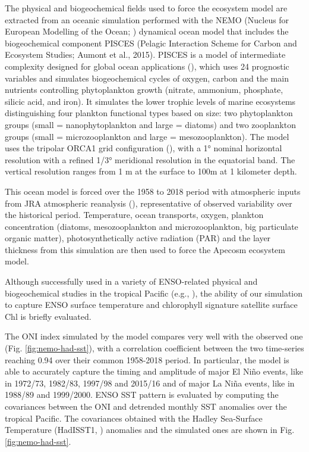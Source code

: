 The physical and biogeochemical fields used to force the ecosystem model are extracted from an oceanic simulation performed with the NEMO (Nucleus for European Modelling of the Ocean; \cite{madecNEMOOceanEngine2019}) dynamical ocean model that includes the biogeochemical component PISCES (Pelagic Interaction Scheme for Carbon and Ecosystem Studies; Aumont et al., 2015). PISCES is a model of intermediate complexity designed for global ocean applications (\cite{aumontPISCESv2OceanBiogeochemical2015}), which uses 24 prognostic variables and simulates biogeochemical cycles of oxygen, carbon and the main nutrients controlling phytoplankton growth (nitrate, ammonium, phosphate, silicic acid, and iron). It simulates the lower trophic levels of marine ecosystems distinguishing four plankton functional types based on size: two phytoplankton groups (small = nanophytoplankton and large = diatoms) and two zooplankton groups (small = microzooplankton and large = mesozooplankton). The model uses the tripolar ORCA1 grid configuration (\cite{madecGlobalOceanMesh1996}), with a 1° nominal horizontal resolution with a refined 1/3° meridional resolution in the equatorial band. The vertical resolution ranges from 1 m at the surface to 100m at 1 kilometer depth.

This ocean model is forced over the 1958 to 2018 period with atmospheric inputs from JRA atmospheric reanalysis (\cite{kobayashiJRA55ReanalysisGeneral2015}), representative of observed variability over the historical period. Temperature, ocean transports, oxygen, plankton concentration (diatoms, mesozooplankton and microzooplankton, big particulate organic matter), photosynthetically active radiation (PAR) and the layer thickness from this simulation are then used to force the Apecosm ecosystem model.

Although successfully used in a variety of ENSO-related physical and biogeochemical studies in the tropical Pacific (e.g., \cite{vialardModelStudyOceanic2001, lengaigneOceanResponseMarch2002, lengaigneInfluenceOceanicBiology2007, schneiderClimateinducedInterannualVariability2008, masottiLargescaleShiftsPhytoplankton2011, currieIndianOceanDipole2013}), the ability of our simulation to capture ENSO surface temperature and chlorophyll signature satellite surface Chl is briefly evaluated. 

The ONI index simulated by the model compares very well with the observed one (Fig. \ref{fig:nemo-had-sst}), with a correlation coefficient between the two time-series reaching 0.94 over their common 1958-2018 period. In particular, the model is able to accurately capture the timing and amplitude of major El Niño events, like in 1972/73, 1982/83, 1997/98 and 2015/16 and of major La Niña events, like in 1988/89 and 1999/2000. ENSO SST pattern is evaluated  by computing the covariances between the ONI and detrended monthly SST anomalies over the tropical Pacific. The covariances obtained with the Hadley Sea-Surface Temperature (HadISST1, \cite{raynerGlobalAnalysesSea2003}) anomalies and the simulated ones are shown in Fig.\ref{fig:nemo-had-sst}.

